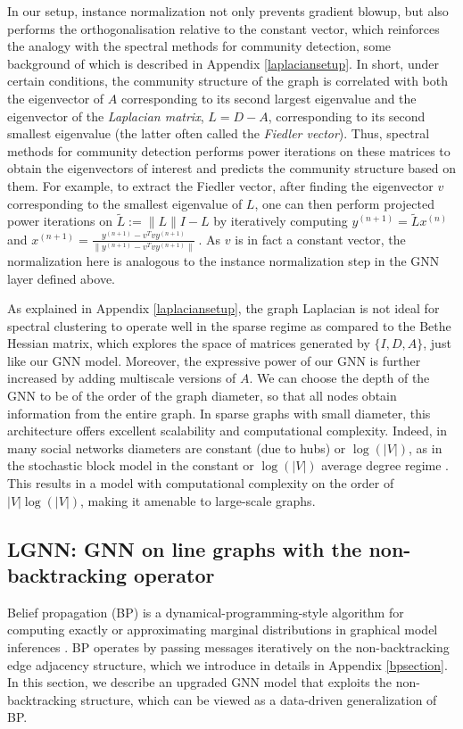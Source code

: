 \documentclass{article} \usepackage{iclr2019_conference,times}
\begin{document}
In our setup, instance normalization not only prevents gradient blowup, but also performs the orthogonalisation relative to the 
constant vector, which reinforces the analogy with the spectral methods for community detection, some background of which is described in Appendix \ref{laplaciansetup}. In short, under certain conditions, the community structure of the graph is correlated with both the eigenvector of $A$ corresponding to its second largest eigenvalue and the eigenvector of the \textit{Laplacian matrix}, $L = D - A$, corresponding to its second smallest eigenvalue (the latter often called the \textit{Fiedler vector}). Thus, spectral methods for community detection performs power iterations on these matrices to obtain the eigenvectors of interest and predicts the community structure based on them. 
For example, to extract the Fiedler vector, after finding the eigenvector $v$ corresponding to the smallest eigenvalue of $L$, one can then perform projected power iterations on $\tilde{L} := \| L \| I - L$ 
by iteratively computing $y^{(n+1)} = \tilde{L} x^{(n)}$ and $x^{(n+1)} = \frac{y^{(n+1)} - v^T v y^{(n+1)} }{\| y^{(n+1)} - v^T v y^{(n+1)} \|}~.$
As $v$ is in fact a constant vector, the normalization here is analogous to the instance normalization step in the GNN layer defined above. 


As explained in Appendix \ref{laplaciansetup}, the graph Laplacian is not ideal for spectral clustering to operate well in the sparse regime as compared to the Bethe Hessian matrix, which explores the space of matrices generated by $\{I, D, A\}$, just like our GNN model. Moreover, the expressive power of our GNN is further increased by adding multiscale versions of $A$. 
We can choose the depth of the GNN to be of the order of the graph diameter, so that all nodes obtain information from the entire graph. In sparse graphs with small diameter, this architecture offers excellent scalability and computational complexity. 
Indeed, in many social networks diameters are constant (due to hubs) or  $\log (|V|)$, as in the stochastic block model in the constant or $\log(|V|)$ average degree regime \citep{riordan2010diameter}. This results in a model with computational complexity on the order of $|V| \log(|V|) $, making it amenable to large-scale graphs. 









\subsection{LGNN: GNN on line graphs with the non-backtracking operator}
\label{linegraphgnn}
Belief propagation (BP) is a dynamical-programming-style algorithm for computing exactly or approximating marginal distributions in graphical model inferences \citep{pearl1982reverend, yedidia2003understanding}. 
BP operates by passing messages iteratively on the non-backtracking edge adjacency structure, which we introduce in details in Appendix \ref{bpsection}.
In this section, we describe an upgraded GNN model that exploits the non-backtracking structure, which can be viewed as a data-driven generalization of BP.
\end{document}
